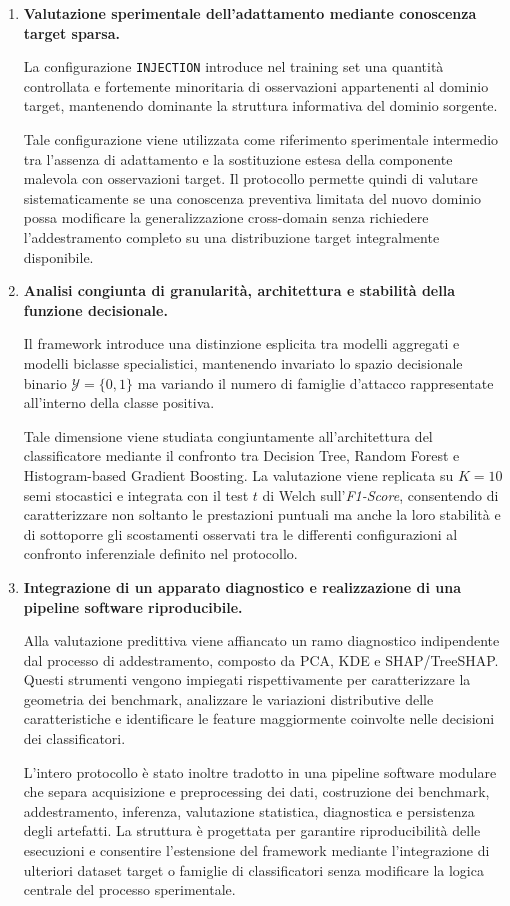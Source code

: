 \begin{enumerate}
    \item \textbf{Valutazione sperimentale dell'adattamento mediante conoscenza target sparsa.}
    
    La configurazione \texttt{INJECTION} introduce nel training set una quantità controllata e fortemente minoritaria di osservazioni appartenenti al dominio target, mantenendo dominante la struttura informativa del dominio sorgente.
    
    Tale configurazione viene utilizzata come riferimento sperimentale intermedio tra l'assenza di adattamento e la sostituzione estesa della componente malevola con osservazioni target. 
    Il protocollo permette quindi di valutare sistematicamente se una conoscenza preventiva limitata del nuovo dominio possa modificare la generalizzazione cross-domain senza richiedere l'addestramento completo su una distribuzione target integralmente disponibile.

    \item \textbf{Analisi congiunta di granularità, architettura e stabilità della funzione decisionale.}
    
    Il framework introduce una distinzione esplicita tra modelli aggregati e modelli biclasse specialistici, mantenendo invariato lo spazio decisionale binario $\mathcal{Y}=\{0,1\}$ ma variando il numero di famiglie d'attacco rappresentate all'interno della classe positiva.
    
    Tale dimensione viene studiata congiuntamente all'architettura del classificatore mediante il confronto tra Decision Tree, Random Forest e Histogram-based Gradient Boosting. 
    La valutazione viene replicata su $K=10$ semi stocastici e integrata con il test $t$ di Welch sull'\textit{F1-Score}, consentendo di caratterizzare non soltanto le prestazioni puntuali ma anche la loro stabilità e di sottoporre gli scostamenti osservati tra le differenti configurazioni al confronto inferenziale definito nel protocollo.

    \item \textbf{Integrazione di un apparato diagnostico e realizzazione di una pipeline software riproducibile.}
    
    Alla valutazione predittiva viene affiancato un ramo diagnostico indipendente dal processo di addestramento, composto da PCA, KDE e SHAP/TreeSHAP. 
    Questi strumenti vengono impiegati rispettivamente per caratterizzare la geometria dei benchmark, analizzare le variazioni distributive delle caratteristiche e identificare le feature maggiormente coinvolte nelle decisioni dei classificatori.
    
    L'intero protocollo è stato inoltre tradotto in una pipeline software modulare che separa acquisizione e preprocessing dei dati, costruzione dei benchmark, addestramento, inferenza, valutazione statistica, diagnostica e persistenza degli artefatti. 
    La struttura è progettata per garantire riproducibilità delle esecuzioni e consentire l'estensione del framework mediante l'integrazione di ulteriori dataset target o famiglie di classificatori senza modificare la logica centrale del processo sperimentale.

\end{enumerate}

